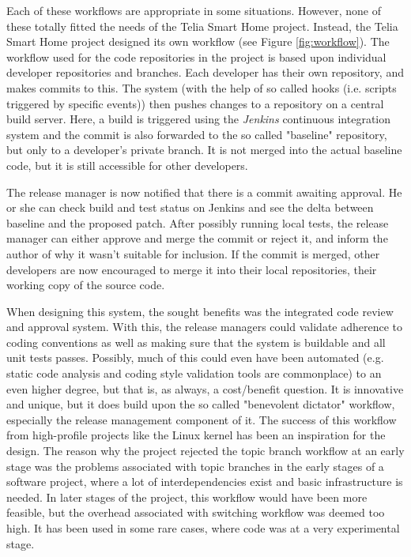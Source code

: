 \documentclass{llncs}
\begin{document}
Each of these workflows are appropriate in some situations. However,
none of these totally fitted the needs of the Telia Smart Home
project. Instead, the Telia Smart Home project designed its own
workflow (see Figure \ref{fig:workflow}). The workflow used for the
code repositories in the project is based upon individual developer
repositories and branches.  Each developer has their own repository,
and makes commits to this. The system (with the help of so called
hooks (i.e. scripts triggered by specific events)) then pushes changes
to a repository on a central build server. Here, a build is triggered
using the \emph{Jenkins} continuous integration system and the commit
is also forwarded to the so called "baseline" repository, but only to
a developer's private branch. It is not merged into the actual
baseline code, but it is still accessible for other developers.

The release manager is now notified that there is a commit awaiting
approval. He or she can check build and test status on Jenkins and see the
delta between baseline and the proposed patch. After possibly running local
tests, the release manager can either approve and merge the commit or
reject it, and inform the author of why it wasn't suitable for inclusion.
If the commit is merged, other developers are now encouraged to merge it 
into their local repositories, their working copy of the source code. 

When designing this system, the sought benefits was the integrated
code review and approval system. With this, the release managers could
validate adherence to coding conventions as well as making sure that
the system is buildable and all unit tests passes. Possibly, much of
this could even have been automated (e.g. static code analysis and
coding style validation tools are commonplace) to an even higher
degree, but that is, as always, a cost/benefit question. It is
innovative and unique, but it does build upon the so called
"benevolent dictator" workflow, especially the release management
component of it. The success of this workflow from high-profile
projects like the Linux kernel has been an inspiration for the design.
The reason why the project rejected the topic branch workflow at an
early stage was the problems associated with topic branches in the
early stages of a software project, where a lot of interdependencies
exist and basic infrastructure is needed. In later stages of the
project, this workflow would have been more feasible, but the overhead
associated with switching workflow was deemed too high. It has been
used in some rare cases, where code was at a very experimental stage.
\end{document}
